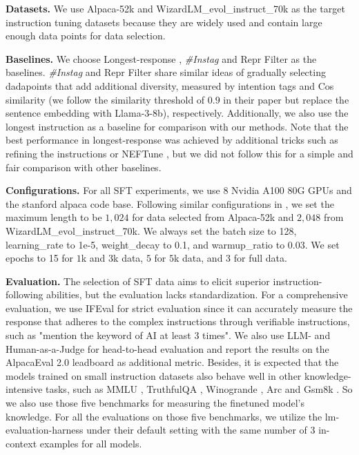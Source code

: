 \textbf{Datasets.} We use Alpaca-52k and WizardLM\_evol\_instruct\_70k as the target instruction tuning datasets because they are widely used and contain large enough data points for data selection.
 
\textbf{Baselines.} We choose Longest-response \citep{zhaolong}, \textit{\#Instag} \citep{lu2023instag} and Repr Filter \citep{liumakes}  as the baselines. 
\textit{\#Instag} \citep{lu2023instag} and Repr Filter \citep{liumakes} share similar ideas of gradually selecting dadapoints that add additional diversity, measured by intention tags and Cos similarity (we follow the similarity threshold of $0.9$ in their paper but replace the sentence embedding with Llama-3-8b), respectively.
Additionally, we also use the longest instruction as a baseline for comparison with our methods. 
Note that the best performance in longest-response \citep{zhaolong} was achieved by additional tricks such as refining the instructions or NEFTune \citep{jainneftune}, but we did not follow this for a simple and fair comparison with other baselines.

\textbf{Configurations.} For all SFT experiments, we use 8 Nvidia A100 80G GPUs and the stanford alpaca code base. Following similar configurations in \citep{zhaolong}, we set the maximum length to be $1,024$ for data selected from Alpaca-52k and $2,048$ from WizardLM\_evol\_instruct\_70k. We always set the batch size to 128, learning\_rate to 1e-5, weight\_decay to 0.1, and warmup\_ratio to 0.03. We set epochs to 15 for $1$k and $3$k data, $5$ for $5$k data, and $3$ for full data. 



\textbf{Evaluation.}
The selection of SFT data aims to elicit superior instruction-following abilities, but the evaluation lacks standardization.
For a comprehensive evaluation, we use IFEval \citep{zhou2023instruction} for strict evaluation since it can accurately measure the response that adheres to the complex instructions through verifiable instructions, such as  "mention the keyword of AI at least 3 times".
We also use LLM- and Human-as-a-Judge for head-to-head evaluation and report the results on the AlpacaEval 2.0 leadboard as additional metric.
Besides, it is expected that the models trained on small instruction datasets also behave well in other knowledge-intensive tasks, such as MMLU \citep{hendrycksmeasuring}, TruthfulQA \citep{lin2022truthfulqa}, Winogrande \citep{sakaguchi2020winogrande}, Arc \citep{clark2018think} and Gsm8k \citep{cobbe2021training}. So we also use those five benchmarks for measuring the finetuned model's knowledge.
For all the evaluations on those five benchmarks, we utilize the lm-evaluation-harness under their default setting with the same number of $3$ in-context examples for all models.

